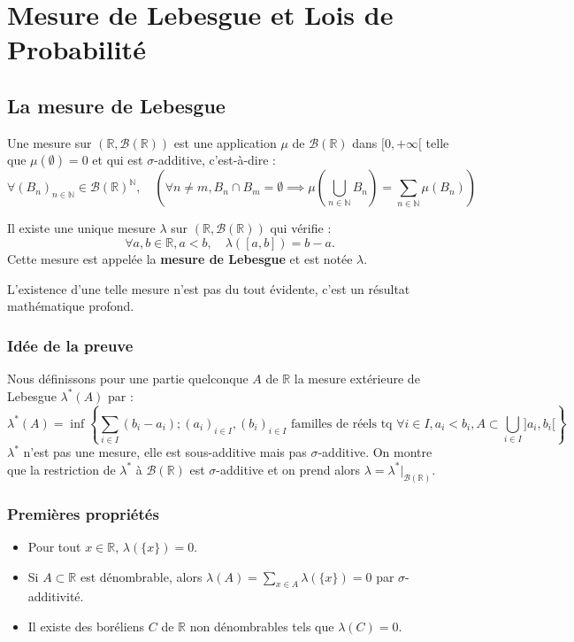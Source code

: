 \chapter{Mesure de Lebesgue et Lois de Probabilité}
\sloppy


\section{La mesure de Lebesgue}
\begin{definition}
Une mesure sur $(\mathbb{R}, \mathcal{B}(\mathbb{R}))$ est une application $\mu$ de $\mathcal{B}(\mathbb{R})$ dans $[0, +\infty[$ telle que $\mu(\emptyset) = 0$ et qui est $\sigma$-additive, c'est-à-dire :
\[
\forall (B_n)_{n \in \mathbb{N}} \in \mathcal{B}(\mathbb{R})^{\mathbb{N}}, \quad \left( \forall n \neq m, B_n \cap B_m = \emptyset \implies \mu\left(\bigcup_{n \in \mathbb{N}} B_n\right) = \sum_{n \in \mathbb{N}} \mu(B_n) \right)
\]
\end{definition}
\begin{theorem}
Il existe une unique mesure $\lambda$ sur $(\mathbb{R}, \mathcal{B}(\mathbb{R}))$ qui vérifie :
\[
\forall a, b \in \mathbb{R}, a < b, \quad \lambda([a,b]) = b-a.
\]
Cette mesure est appelée la \textbf{mesure de Lebesgue} et est notée $\lambda$.
\end{theorem}
\begin{remark}
L'existence d'une telle mesure n'est pas du tout évidente, c'est un résultat mathématique profond.
\end{remark}
\subsection*{Idée de la preuve}
Nous définissons pour une partie quelconque $A$ de $\mathbb{R}$ la mesure extérieure de Lebesgue $\lambda^*(A)$ par :
\[
\lambda^*(A) = \inf \left\{ \sum_{i \in I} (b_i - a_i) ; (a_i)_{i \in I}, (b_i)_{i \in I} \text{ familles de réels tq } \forall i \in I, a_i < b_i, A \subset \bigcup_{i \in I} ]a_i, b_i[ \right\}
\]
$\lambda^*$ n'est pas une mesure, elle est sous-additive mais pas $\sigma$-additive. On montre que la restriction de $\lambda^*$ à $\mathcal{B}(\mathbb{R})$ est $\sigma$-additive et on prend alors $\lambda = \lambda^*|_{\mathcal{B}(\mathbb{R})}$.
\subsection*{Premières propriétés}
\begin{itemize}
    \item Pour tout $x \in \mathbb{R}$, $\lambda(\{x\}) = 0$.
    \item Si $A \subset \mathbb{R}$ est dénombrable, alors $\lambda(A) = \sum_{x \in A} \lambda(\{x\}) = 0$ par $\sigma$-additivité.
    \item Il existe des boréliens $C$ de $\mathbb{R}$ non dénombrables tels que $\lambda(C)=0$.
\end{itemize}
